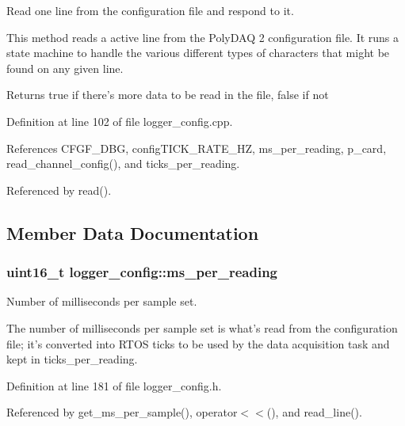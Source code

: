 Read one line from the configuration file and respond to it. 

This method reads a active line from the Poly\-D\-A\-Q 2 configuration file. It runs a state machine to handle the various different types of characters that might be found on any given line. \begin{DoxyReturn}{Returns}
{\ttfamily true} if there's more data to be read in the file, {\ttfamily false} if not 
\end{DoxyReturn}


Definition at line 102 of file logger\-\_\-config.\-cpp.



References C\-F\-G\-F\-\_\-\-D\-B\-G, config\-T\-I\-C\-K\-\_\-\-R\-A\-T\-E\-\_\-\-H\-Z, ms\-\_\-per\-\_\-reading, p\-\_\-card, read\-\_\-channel\-\_\-config(), and ticks\-\_\-per\-\_\-reading.



Referenced by read().



\subsection{Member Data Documentation}
\hypertarget{classlogger__config_aced003cf2337160be6d8288f10f116d2}{
\subsubsection[{ms\-\_\-per\-\_\-reading}]{\setlength{\rightskip}{0pt plus 5cm}uint16\-\_\-t logger\-\_\-config\-::ms\-\_\-per\-\_\-reading\hspace{0.3cm}{\ttfamily [protected]}}}\label{classlogger__config_aced003cf2337160be6d8288f10f116d2}


Number of milliseconds per sample set. 

The number of milliseconds per sample set is what's read from the configuration file; it's converted into R\-T\-O\-S ticks to be used by the data acquisition task and kept in {\ttfamily ticks\-\_\-per\-\_\-reading}. 

Definition at line 181 of file logger\-\_\-config.\-h.



Referenced by get\-\_\-ms\-\_\-per\-\_\-sample(), operator$<$$<$(), and read\-\_\-line().

